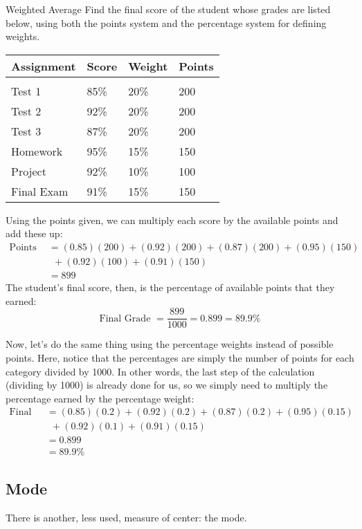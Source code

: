 \begin{example}{Weighted Average}
Find the final score of the student whose grades are listed below, using both the points system and the percentage system for defining weights.
\begin{center}
\begin{tabular}{l l l l}
\textbf{Assignment} & \textbf{Score} & \textbf{Weight} & \textbf{Points}\\
\hline
& \\
Test 1 & 85\% & 20\% & 200\\
Test 2 & 92\% & 20\% & 200\\
Test 3 & 87\% & 20\% & 200\\
Homework & 95\% & 15\% & 150\\
Project & 92\% & 10\% & 100\\
Final Exam & 91\% & 15\% & 150
\end{tabular}
\end{center}

\sol
Using the points given, we can multiply each score by the available points and add these up:
\begin{align*}
\textrm{Points earned } &= (0.85)(200) + (0.92)(200) + (0.87)(200) + (0.95)(150)\\
&\ \ + (0.92)(100) + (0.91)(150)\\
&= 899
\end{align*}
The student's final score, then, is the percentage of available points that they earned:
\[\textrm{Final Grade } = \dfrac{899}{1000} = 0.899 = \boxed{89.9\%}\]

Now, let's do the same thing using the percentage weights instead of possible points.  Here, notice that the percentages are simply the number of points for each category divided by 1000.  In other words, the last step of the calculation (dividing by 1000) is already done for us, so we simply need to multiply the percentage earned by the percentage weight:
\begin{align*}
\textrm{Final Grade } &= (0.85)(0.2) + (0.92)(0.2) + (0.87)(0.2) + (0.95)(0.15)\\
&\ \ + (0.92)(0.1) + (0.91)(0.15)\\
&= 0.899\\
&= \boxed{89.9\%}
\end{align*}
\end{example}

\subsection{Mode}
There is another, less used, measure of center: the mode. 

